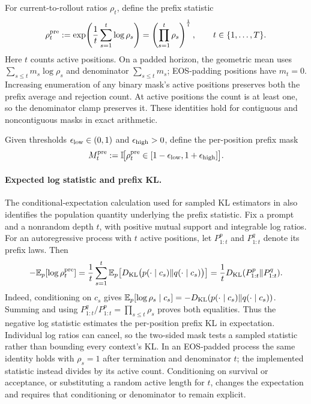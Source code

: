 \begin{definition}
\label{def:prefix-is}
For current-to-rollout ratios $\rho_t$, define the prefix statistic
\begin{equation}
    \rho_{t}^{\mathrm{pre}}
    := \exp\!\left(\frac{1}{t}\sum_{s=1}^{t} \log \rho_s\right)
    = \left(\prod_{s=1}^{t}\rho_s\right)^{\frac{1}{t}},
    \qquad
    t\in\{1,\ldots,T\}.
    \label{eq:prefix-is}
\end{equation}
Here $t$ counts active positions. On a padded horizon, the geometric mean
uses $\sum_{s\le t}m_s\log \rho_s$ and denominator $\sum_{s\le t}m_s$;
EOS-padding positions have $m_t=0$. Increasing enumeration of any binary
mask's active positions preserves both the prefix average and rejection
count. At active positions the count is at least one, so the denominator
clamp preserves it. These identities hold for contiguous and noncontiguous
masks in exact arithmetic.
\end{definition}

\begin{definition}
\label{def:prefix-trm-proxy}
Given thresholds $\epsilon_{\mathrm{low}}\in(0,1)$ and $\epsilon_{\mathrm{high}}>0$, define the per-position prefix mask
\begin{equation}
    M_t^{\mathrm{pre}} := \mathbb{I}\!\big[\rho_{t}^{\mathrm{pre}} \in [1-\epsilon_{\mathrm{low}}, 1+\epsilon_{\mathrm{high}}]\big].
    \label{eq:prefix-mask}
\end{equation}
\end{definition}

\paragraph{Expected log statistic and prefix KL.}
The conditional-expectation calculation used for sampled KL estimators in
\citet[Appendix, Sample-Based Estimators]{li2025trm} also identifies the
population quantity underlying the prefix statistic. Fix a prompt and a
nonrandom depth $t$, with positive mutual support and integrable log ratios.
For an autoregressive process with $t$ active positions, let $P_{1:t}^p$
and $P_{1:t}^q$ denote its prefix laws. Then
\begin{equation}
 -\mathbb{E}_p[\log\rho_{t}^{\mathrm{pre}}]
 =\frac1t\sum_{s=1}^t\mathbb{E}_p\!\left[
 D_{\rm KL}\bigl(p(\cdot\mid c_s)\|q(\cdot\mid c_s)\bigr)\right]
 =\frac1t D_{\rm KL}(P_{1:t}^p\|P_{1:t}^q).
 \label{eq:prefix-expected-kl}
\end{equation}
Indeed, conditioning on $c_s$ gives
$\mathbb{E}_p[\log\rho_s\mid c_s]=-D_{\rm KL}(p(\cdot\mid c_s)\|q(\cdot\mid c_s))$.
Summing and using $P_{1:t}^q/P_{1:t}^p=\prod_{s\le t}\rho_s$
proves both equalities. Thus the negative log statistic estimates the
per-position prefix KL in expectation. Individual log ratios can cancel,
so the two-sided mask tests a sampled statistic rather than bounding every
context's KL. In an EOS-padded process the same identity holds with
$\rho_s=1$ after termination and denominator $t$; the implemented statistic
instead divides by its active count. Conditioning on survival or acceptance,
or substituting a random active length for $t$, changes the expectation and
requires that conditioning or denominator to remain explicit.

